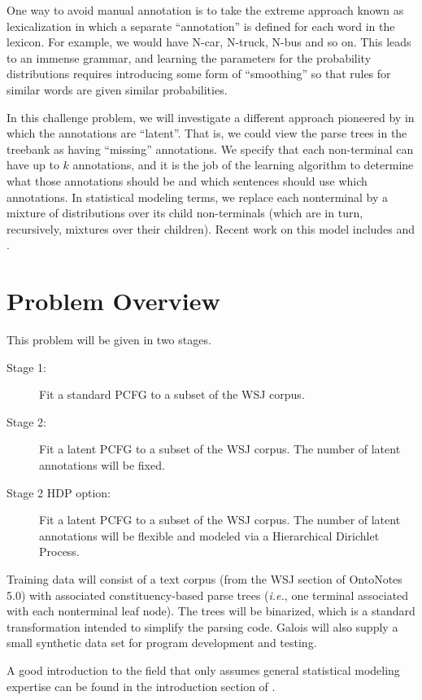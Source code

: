 \documentclass[english]{article}
\begin{document}
One way to avoid manual annotation is to take the extreme approach known as lexicalization in which a separate ``annotation'' is defined for each word in the lexicon. For example, we would have N-car, N-truck, N-bus and so on.  This leads to an immense grammar, and learning the parameters for the probability distributions requires introducing some form of ``smoothing'' so that rules for similar words are given similar probabilities.

In this challenge problem, we will investigate a different approach pioneered by \citet{Matsuzaki2005} in which the annotations are ``latent''.  That is, we could view the parse trees in the treebank as having ``missing'' annotations.  We specify that each non-terminal can have up to $k$ annotations, and it is the job of the learning algorithm to determine what those annotations should be and which sentences should use which annotations.  In statistical modeling terms, we replace each nonterminal by a mixture of distributions over its child non-terminals (which are in turn, recursively, mixtures over their children).  Recent work on this model includes \citet{Petrov2006} and \citet{Cohen2012}.  

\section{Problem Overview}

This problem will be given in two stages.  
\begin{description}
\item[Stage 1:] Fit a standard PCFG to a subset of the WSJ corpus.
\item[Stage 2:] Fit a latent PCFG to a subset of the WSJ corpus. The number of latent annotations will be fixed.
\item[Stage 2 HDP option:] Fit a latent PCFG to a subset of the WSJ corpus. The number of latent annotations will be flexible and modeled via a Hierarchical Dirichlet Process.
\end{description}

Training data will consist of a text corpus (from the WSJ section of OntoNotes 5.0) with associated constituency-based parse trees (\emph{i.e.}, one terminal associated with each nonterminal leaf node). The trees will be binarized, which is a standard transformation intended to simplify the parsing code. Galois will also supply a small synthetic data set for program development and testing.

A good introduction to the field that only assumes general statistical modeling expertise can be found in the introduction section of \citet{Liang2009}.
\end{document}
